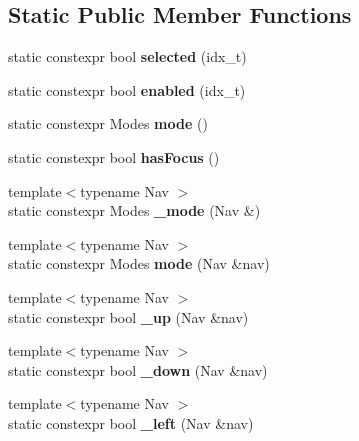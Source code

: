 \subsection*{Static Public Member Functions}
\begin{DoxyCompactItemize}
\item 
\mbox{\label{structDrift_a6260e45ffc337523248c743c214844fc}} 
static constexpr bool {\bfseries selected} (idx\+\_\+t)
\item 
\mbox{\label{structDrift_ab522b977256dd79511c0c4937753a121}} 
static constexpr bool {\bfseries enabled} (idx\+\_\+t)
\item 
\mbox{\label{structDrift_a88f5e9078152058b38f6815e80a712b1}} 
static constexpr Modes {\bfseries mode} ()
\item 
\mbox{\label{structDrift_aacbb9050974ee5ba1ec1379b25fafeba}} 
static constexpr bool {\bfseries has\+Focus} ()
\item 
\mbox{\label{structDrift_a84178af789937686c8b24d82901ac0c8}} 
{\footnotesize template$<$typename Nav $>$ }\\static constexpr Modes {\bfseries \+\_\+mode} (Nav \&)
\item 
\mbox{\label{structDrift_a0e42a1cf9e6cab2afe89b0ade322eb0c}} 
{\footnotesize template$<$typename Nav $>$ }\\static constexpr Modes {\bfseries mode} (Nav \&nav)
\item 
\mbox{\label{structDrift_ae224efc028a86e9c3ac9dcedabe0df7a}} 
{\footnotesize template$<$typename Nav $>$ }\\static constexpr bool {\bfseries \+\_\+up} (Nav \&nav)
\item 
\mbox{\label{structDrift_abae8736b1ace13ea08f30e245551f725}} 
{\footnotesize template$<$typename Nav $>$ }\\static constexpr bool {\bfseries \+\_\+down} (Nav \&nav)
\item 
\mbox{\label{structDrift_aae453d31807686fd21326ab90ed32662}} 
{\footnotesize template$<$typename Nav $>$ }\\static constexpr bool {\bfseries \+\_\+left} (Nav \&nav)

\end{DoxyCompactItemize}
